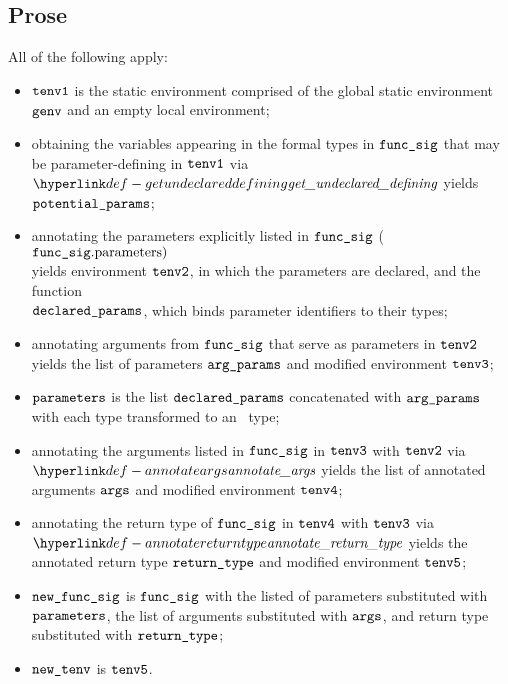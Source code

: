 \subsection{Prose}
All of the following apply:
\begin{itemize}
  \item $\texttt{tenv1}$ is the static environment comprised of the global static environment $\texttt{genv}$ and an empty local environment;
  \item obtaining the variables appearing in the formal types in $\texttt{func\_sig}$ that may be parameter-defining
        in $\texttt{tenv1}$ via $\getundeclareddefining$ yields \\ $\texttt{potential\_params}$;
  \item annotating the parameters explicitly listed in $\texttt{func\_sig}$ ($\texttt{func\_sig}.\text{parameters})$ \\
        yields environment $\texttt{tenv2}$, in which the parameters are declared,
        and the function \\
        $\texttt{declared\_params}$, which binds parameter identifiers to their types\ProseOrTypeError;
  \item annotating arguments from $\texttt{func\_sig}$ that serve as parameters in $\texttt{tenv2}$ yields the list of parameters
        $\texttt{arg\_params}$ and modified environment $\texttt{tenv3}$\ProseOrTypeError;
  \item $\texttt{parameters}$ is the list $\texttt{declared\_params}$ concatenated with $\texttt{arg\_params}$ with each type
        transformed to an \optional\ type;
  \item annotating the arguments listed in $\texttt{func\_sig}$ in $\texttt{tenv3}$ with $\texttt{tenv2}$ via \\
        $\annotateargs$ yields the list of annotated
        arguments $\texttt{args}$ and modified environment $\texttt{tenv4}$\ProseOrTypeError;
  \item annotating the return type of $\texttt{func\_sig}$ in $\texttt{tenv4}$ with $\texttt{tenv3}$ via \\ $\annotatereturntype$ yields
        the annotated return type $\texttt{return\_type}$ and modified environment $\texttt{tenv5}$\ProseOrTypeError;
  \item $\texttt{new\_func\_sig}$ is $\texttt{func\_sig}$ with the listed of parameters substituted with \\ $\texttt{parameters}$,
        the list of arguments substituted with $\texttt{args}$, and return type substituted with $\texttt{return\_type}$;
  \item $\texttt{new\_tenv}$ is $\texttt{tenv5}$.
\end{itemize}

